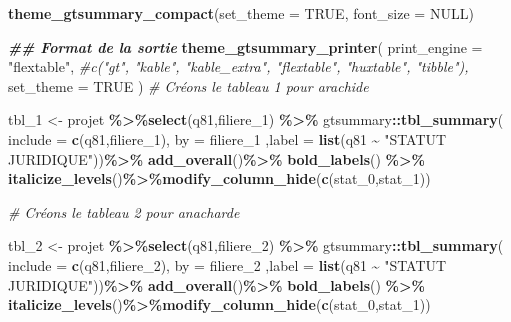 \documentclass[
]{article}
\newenvironment{Shaded}{\begin{snugshade}}{\end{snugshade}}
\newcommand{\AttributeTok}[1]{\textcolor[rgb]{0.13,0.29,0.53}{#1}}
\newcommand{\CommentTok}[1]{\textcolor[rgb]{0.56,0.35,0.01}{\textit{#1}}}
\newcommand{\ConstantTok}[1]{\textcolor[rgb]{0.56,0.35,0.01}{#1}}
\newcommand{\DocumentationTok}[1]{\textcolor[rgb]{0.56,0.35,0.01}{\textbf{\textit{#1}}}}
\newcommand{\FunctionTok}[1]{\textcolor[rgb]{0.13,0.29,0.53}{\textbf{#1}}}
\newcommand{\NormalTok}[1]{#1}
\newcommand{\OtherTok}[1]{\textcolor[rgb]{0.56,0.35,0.01}{#1}}
\newcommand{\SpecialCharTok}[1]{\textcolor[rgb]{0.81,0.36,0.00}{\textbf{#1}}}
\newcommand{\StringTok}[1]{\textcolor[rgb]{0.31,0.60,0.02}{#1}}
\begin{document}
\begin{Shaded}
\begin{Highlighting}[]
\FunctionTok{theme\_gtsummary\_compact}\NormalTok{(}\AttributeTok{set\_theme =} \ConstantTok{TRUE}\NormalTok{, }\AttributeTok{font\_size =} \ConstantTok{NULL}\NormalTok{)}

\DocumentationTok{\#\# Format de la sortie}
\FunctionTok{theme\_gtsummary\_printer}\NormalTok{(}
  \AttributeTok{print\_engine =} \StringTok{"flextable"}\NormalTok{,  }
  \CommentTok{\#c("gt", "kable", "kable\_extra", "flextable", "huxtable", "tibble"),}
  \AttributeTok{set\_theme =} \ConstantTok{TRUE}
\NormalTok{)}
               \CommentTok{\# Créons le tableau 1 pour arachide}

\NormalTok{tbl\_1 }\OtherTok{\textless{}{-}}\NormalTok{ projet }\SpecialCharTok{\%\textgreater{}\%}\FunctionTok{select}\NormalTok{(q81,filiere\_1) }\SpecialCharTok{\%\textgreater{}\%}
\NormalTok{  gtsummary}\SpecialCharTok{::}\FunctionTok{tbl\_summary}\NormalTok{(}
    \AttributeTok{include =} \FunctionTok{c}\NormalTok{(q81,filiere\_1),}
    \AttributeTok{by =}\NormalTok{ filiere\_1}
\NormalTok{  ,}\AttributeTok{label =} \FunctionTok{list}\NormalTok{(q81 }\SpecialCharTok{\textasciitilde{}} \StringTok{"STATUT JURIDIQUE"}\NormalTok{))}\SpecialCharTok{\%\textgreater{}\%}
  \FunctionTok{add\_overall}\NormalTok{()}\SpecialCharTok{\%\textgreater{}\%}
  \FunctionTok{bold\_labels}\NormalTok{() }\SpecialCharTok{\%\textgreater{}\%}
  \FunctionTok{italicize\_levels}\NormalTok{()}\SpecialCharTok{\%\textgreater{}\%}\FunctionTok{modify\_column\_hide}\NormalTok{(}\FunctionTok{c}\NormalTok{(stat\_0,stat\_1))}

               \CommentTok{\# Créons le tableau 2 pour anacharde}

\NormalTok{tbl\_2 }\OtherTok{\textless{}{-}}\NormalTok{ projet }\SpecialCharTok{\%\textgreater{}\%}\FunctionTok{select}\NormalTok{(q81,filiere\_2) }\SpecialCharTok{\%\textgreater{}\%}
\NormalTok{  gtsummary}\SpecialCharTok{::}\FunctionTok{tbl\_summary}\NormalTok{(}
    \AttributeTok{include =} \FunctionTok{c}\NormalTok{(q81,filiere\_2),}
    \AttributeTok{by =}\NormalTok{ filiere\_2}
\NormalTok{  ,}\AttributeTok{label =} \FunctionTok{list}\NormalTok{(q81 }\SpecialCharTok{\textasciitilde{}} \StringTok{"STATUT JURIDIQUE"}\NormalTok{))}\SpecialCharTok{\%\textgreater{}\%}
  \FunctionTok{add\_overall}\NormalTok{()}\SpecialCharTok{\%\textgreater{}\%}
  \FunctionTok{bold\_labels}\NormalTok{() }\SpecialCharTok{\%\textgreater{}\%}
  \FunctionTok{italicize\_levels}\NormalTok{()}\SpecialCharTok{\%\textgreater{}\%}\FunctionTok{modify\_column\_hide}\NormalTok{(}\FunctionTok{c}\NormalTok{(stat\_0,stat\_1))}


\end{Highlighting}
\end{Shaded}
\end{document}
